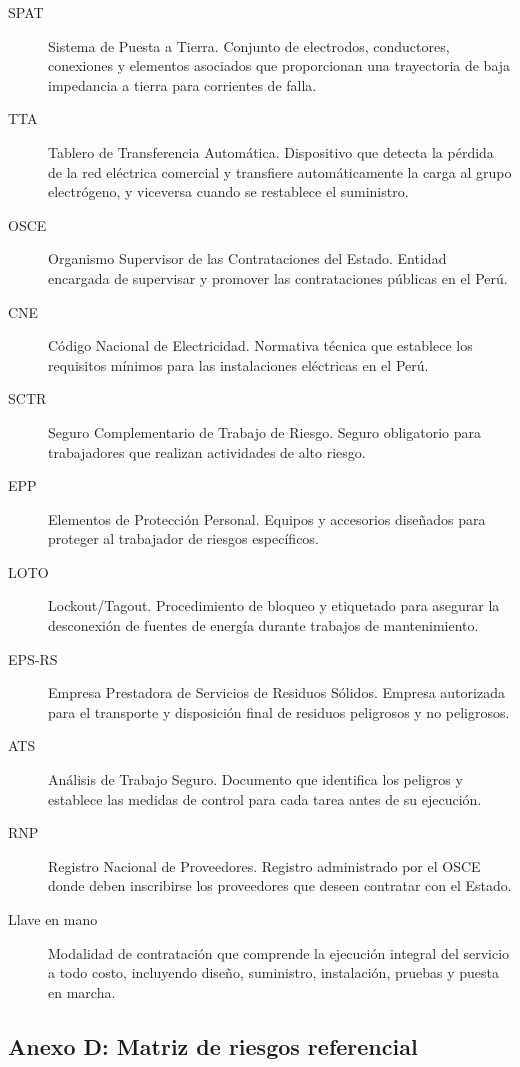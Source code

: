 \documentclass[12pt,a4paper]{article}
\begin{document}
\begin{description}
  \item[SPAT] Sistema de Puesta a Tierra. Conjunto de electrodos, conductores, conexiones y elementos asociados que proporcionan una trayectoria de baja impedancia a tierra para corrientes de falla.
  \item[TTA] Tablero de Transferencia Automática. Dispositivo que detecta la pérdida de la red eléctrica comercial y transfiere automáticamente la carga al grupo electrógeno, y viceversa cuando se restablece el suministro.
  \item[OSCE] Organismo Supervisor de las Contrataciones del Estado. Entidad encargada de supervisar y promover las contrataciones públicas en el Perú.
  \item[CNE] Código Nacional de Electricidad. Normativa técnica que establece los requisitos mínimos para las instalaciones eléctricas en el Perú.
  \item[SCTR] Seguro Complementario de Trabajo de Riesgo. Seguro obligatorio para trabajadores que realizan actividades de alto riesgo.
  \item[EPP] Elementos de Protección Personal. Equipos y accesorios diseñados para proteger al trabajador de riesgos específicos.
  \item[LOTO] Lockout/Tagout. Procedimiento de bloqueo y etiquetado para asegurar la desconexión de fuentes de energía durante trabajos de mantenimiento.
  \item[EPS-RS] Empresa Prestadora de Servicios de Residuos Sólidos. Empresa autorizada para el transporte y disposición final de residuos peligrosos y no peligrosos.
  \item[ATS] Análisis de Trabajo Seguro. Documento que identifica los peligros y establece las medidas de control para cada tarea antes de su ejecución.
  \item[RNP] Registro Nacional de Proveedores. Registro administrado por el OSCE donde deben inscribirse los proveedores que deseen contratar con el Estado.
  \item[Llave en mano] Modalidad de contratación que comprende la ejecución integral del servicio a todo costo, incluyendo diseño, suministro, instalación, pruebas y puesta en marcha.
\end{description}

\subsection{Anexo D: Matriz de riesgos referencial}
\end{document}
